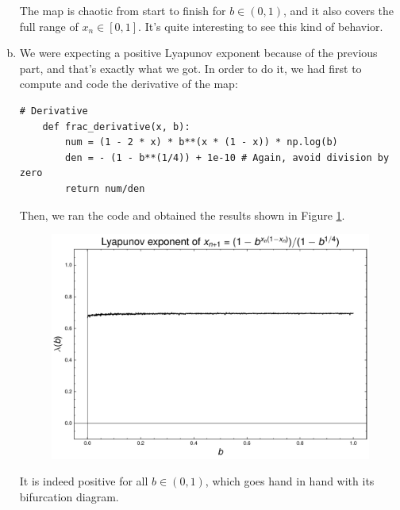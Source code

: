 \begin{enumerate}[(a)]
    The map is chaotic from start to finish for $b \in (0,1)$, and it also covers 
    the full range of $x_n \in [0,1]$. It's quite interesting to see this kind of
    behavior.
    \item We were expecting a positive Lyapunov exponent because of the previous part,
    and that's exactly what we got. In order to do it, we had first to compute and code
    the derivative of the map:
    \begin{lstlisting}[style=pythonstyle]
    # Derivative
    def frac_derivative(x, b):
        num = (1 - 2 * x) * b**(x * (1 - x)) * np.log(b)
        den = - (1 - b**(1/4)) + 1e-10 # Again, avoid division by zero
        return num/den
    \end{lstlisting}
    Then, we ran the code and obtained the results shown in Figure \ref{fig:3c}.
    \begin{figure}[!ht]
        \centering
        \includegraphics[scale=0.65]{images/frac_lya.pdf}
        \label{fig:3c}
    \end{figure}

    It is indeed positive for all $b \in (0,1)$, which goes hand in hand with its
    bifurcation diagram.
\end{enumerate}



% 
% 

